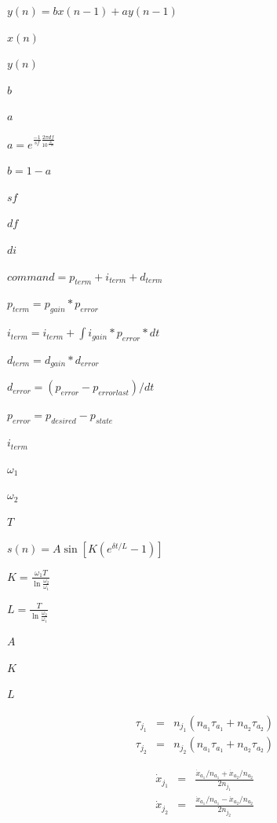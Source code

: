 \documentclass{article}
\begin{document}
$y(n) = b x(n-1) + a y(n-1)$
\pagebreak

$ x(n)$
\pagebreak

$ y(n)$
\pagebreak

$ b $
\pagebreak

$ a $
\pagebreak

$ a = e^{\frac{-1}{sf} \frac{2\pi df}{10^{\frac{di}{-10}}}} $
\pagebreak

$ b = 1 - a $
\pagebreak

$ sf $
\pagebreak

$ df $
\pagebreak

$ di $
\pagebreak

$command  = p_{term} + i_{term} + d_{term} $
\pagebreak

$ p_{term}  = p_{gain} * p_{error} $
\pagebreak

$ i_{term}  = i_{term} + \int{i_{gain} * p_{error} * dt} $
\pagebreak

$ d_{term}  = d_{gain} * d_{error} $
\pagebreak

$ d_{error} = (p_{error} - p_{error last}) / dt $
\pagebreak

$ p_{error}  = p_{desired} - p_{state} $
\pagebreak

$i_{term}$
\pagebreak

$\omega_1$
\pagebreak

$\omega_2$
\pagebreak

$T$
\pagebreak

$s(n) = A \sin [ K(e^{\delta t/L} - 1) ]$
\pagebreak

$K = \frac{\omega_1T}{\ln \frac{\omega_2}{\omega_1} }$
\pagebreak

$L = \frac{T}{\ln \frac{\omega_2}{\omega_1} }$
\pagebreak

$A$
\pagebreak

$K$
\pagebreak

$L$
\pagebreak

\begin{eqnarray*}
\tau_{j_1} & = & n_{j_1} ( n_{a_1} \tau_{a_1} + n_{a_2} \tau_{a_2} ) \\[2.5em]
\tau_{j_2} & = & n_{j_2} ( n_{a_1} \tau_{a_1} + n_{a_2} \tau_{a_2} )
\end{eqnarray*}
\pagebreak

\begin{eqnarray*}
\dot{x}_{j_1} & = & \frac{ \dot{x}_{a_1} / n_{a_1} + \dot{x}_{a_2} / n_{a_2} }{2 n_{j_1}} \\[1em]
\dot{x}_{j_2} & = & \frac{ \dot{x}_{a_1} / n_{a_1} - \dot{x}_{a_2} / n_{a_2} }{2 n_{j_2}}
\end{eqnarray*}
\pagebreak
\end{document}
